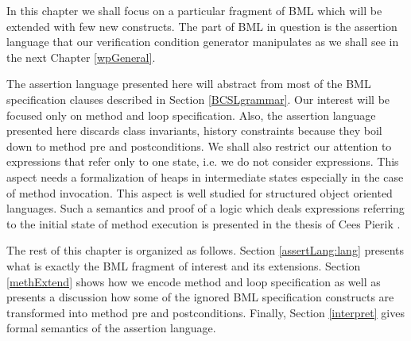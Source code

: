 In this chapter we shall focus on 
 a particular fragment of BML which will be extended with 
few new constructs.  The part of BML in question  
is the assertion language that our  verification condition generator manipulates
 as we shall see in the next Chapter \ref{wpGeneral}.



The assertion language presented here will abstract from most of the BML specification clauses described in Section \ref{BCSLgrammar}.
Our interest will be focused only on method and loop specification. Also, 
the assertion language presented here discards class invariants,
 history constraints  because  they boil down to method pre and postconditions. 
We shall also restrict our attention to expressions that refer only to one state, i.e. 
we do not consider \oldOnly{} expressions.
 This aspect needs a formalization of heaps in intermediate states especially in the
 case of method invocation. This aspect is well studied for structured object oriented languages.
 Such a  semantics and proof of a logic which deals expressions referring to the initial state of 
method execution is presented in  the thesis of Cees Pierik \cite{CP03VTO}. 


The rest of this chapter is organized as follows. Section \ref{assertLang:lang} presents
what is exactly the BML fragment of interest and its extensions.
Section \ref{methExtend} shows how we encode method and loop specification as well as presents a discussion
how some of the ignored BML specification constructs are transformed into method pre and postconditions.
Finally, Section \ref{interpret} gives formal semantics of the assertion language.

